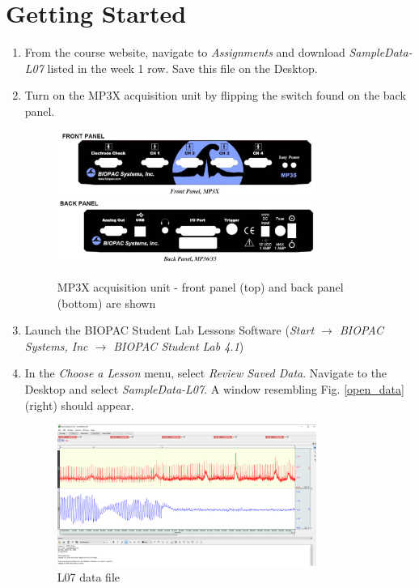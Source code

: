 \documentclass{article}
\begin{document}
\section*{Getting Started}
\begin{enumerate}
	\item From the course website, navigate to \textit{Assignments} and download \textit{SampleData-L07} listed in the week 1 row. Save this file on the Desktop.
	\item Turn on the MP3X acquisition unit by flipping the switch found on the back panel.
		\begin{figure}[h]
		\includegraphics[width=0.8\textwidth]{../images/BIOPAC_2a.jpg}
		\includegraphics[width=0.8\textwidth]{../images/BIOPAC_2b.jpg}
		\centering
		\caption{MP3X acquisition unit - front panel (top) and back panel (bottom) are shown}
		\label{panels}
		\end{figure}
		
	\item Launch the BIOPAC Student Lab Lessons Software (\textit{Start $\rightarrow$ BIOPAC Systems, Inc $\rightarrow$ BIOPAC Student Lab 4.1})
	\item In the \textit{Choose a Lesson} menu, select \textit{Review Saved Data}. Navigate to the Desktop and select \textit{SampleData-L07}. A window resembling Fig. \ref{open_data} (right) should appear.
	
		\begin{figure}[h]
		\includegraphics[width=0.8\textwidth]{../images/BIOPAC_21.png}
		\centering
		\caption{L07 data file}
		\label{sample_data}
		\end{figure}
\end{enumerate}
\end{document}
